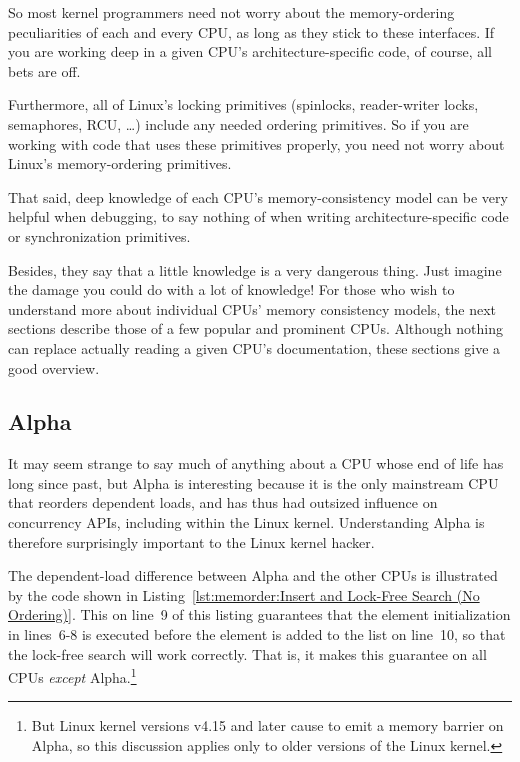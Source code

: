 So most kernel programmers need not worry about the memory-ordering
peculiarities of each and every CPU, as long as they stick to these
interfaces.
If you are working deep in a given CPU's architecture-specific code,
of course, all bets are off.

Furthermore,
all of Linux's locking primitives (spinlocks, reader-writer locks,
semaphores, RCU, \ldots) include any needed ordering primitives.
So if you are working with code that uses these primitives properly,
you need not worry about Linux's memory-ordering primitives.

That said, deep knowledge of each CPU's memory-consistency model
can be very helpful when debugging, to say nothing of when writing
architecture-specific code or synchronization primitives.

Besides, they say that a little knowledge is a very dangerous thing.
Just imagine the damage you could do with a lot of knowledge!
For those who wish to understand more about individual CPUs'
memory consistency models, the next sections describe those of a few
popular and prominent CPUs.
Although nothing can replace actually reading a given CPU's documentation,
these sections give a good overview.

\subsection{Alpha}
\label{sec:memorder:Alpha}

It may seem strange to say much of anything about a CPU whose end of life
has long since past, but Alpha is interesting because it is the only
mainstream CPU that reorders dependent loads, and has thus had outsized
influence on concurrency APIs, including within the Linux kernel.
Understanding Alpha is therefore surprisingly important to the Linux kernel
hacker.

The dependent-load difference between Alpha and the other CPUs is
illustrated by the code shown in
Listing~\ref{lst:memorder:Insert and Lock-Free Search (No Ordering)}.
This  on line~9 of this listing
guarantees that the element initialization
in lines~6-8 is executed before the element is added to the
list on line~10, so that the lock-free search will work correctly.
That is, it makes this guarantee on all CPUs {\em except} Alpha.\footnote{
	But Linux kernel versions v4.15 and later cause 
	to emit a memory barrier on Alpha, so this discussion applies
	only to older versions of the Linux kernel.}

